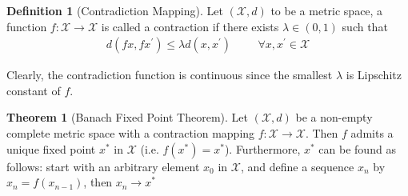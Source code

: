 \documentclass[a4paper]{article}
\theoremstyle{definition}
\newtheorem{defn}{Definition}[section]
\newtheorem{theo}{Theorem}[section]
\begin{document}
\begin{defn}[Contradiction Mapping]
Let $(\mathcal{X}, d)$ to be a metric space, a function $f: \mathcal{X} \rightarrow \mathcal{X}$ is called a contraction if there exists $\lambda \in (0,1)$ such that
\begin{align*}
d(fx, fx^{'}) \leq \lambda d(x, x^{'}) \hspace{1cm} \forall x, x^{'} \in \mathcal{X}
\end{align*}
\end{defn}
Clearly, the contradiction function is continuous since the smallest $\lambda$ is Lipschitz constant of $f$. 

\begin{theo}[Banach Fixed Point Theorem]
Let $(\mathcal{X}, d)$ be a non-empty complete metric space with a contraction mapping $f: \mathcal{X} \rightarrow \mathcal{X}$. Then $f$ admits a unique fixed point $x^{*}$ in $\mathcal{X}$ (i.e. $f(x^{*}) = x^{*}$). Furthermore, $x^*$ can be found as follows: start with an arbitrary element $x_0$ in $\mathcal{X}$, and define a sequence ${x_n}$ by $x_n = f(x_{n-1})$, then $x_n \rightarrow x^{*}$
\end{theo}
\end{document}
